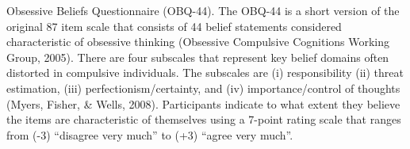 Obsessive Beliefs Questionnaire (OBQ-44). The OBQ-44 is a short version of the original 87 item scale that consists of 44 belief statements considered characteristic of obsessive thinking (Obsessive Compulsive Cognitions Working Group, 2005). There are four subscales that represent key belief domains often distorted in compulsive individuals. The subscales are (i) responsibility (ii) threat estimation, (iii) perfectionism/certainty, and (iv) importance/control of thoughts (Myers, Fisher, & Wells, 2008). Participants indicate to what extent they believe the items are characteristic of themselves using a 7-point rating scale that ranges from (-3) “disagree very much” to (+3) “agree very much”.



